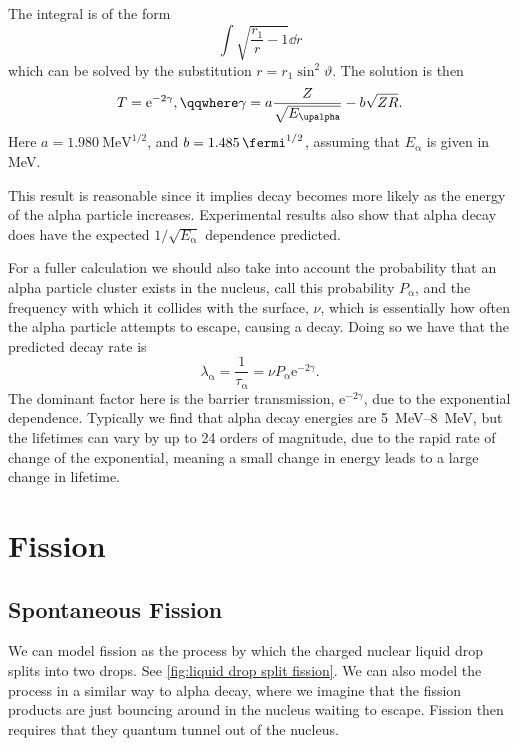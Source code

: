 \documentclass[fleqn]{NotesClass}
\newcommand*{\Palpha}{\ensuremath{\upalpha}}
\newcommand{\e}{\mathrm{e}}
\begin{document}
    The integral is of the form
    \begin{equation}
        \int \sqrt{\frac{r_1}{r} - 1} \dd{r}
    \end{equation}
    which can be solved by the substitution \(r = r_1 \sin^2\vartheta\).
    The solution is then
    \begin{equation}
        T = \e^{-2\gamma}, \qqwhere \gamma = a\frac{Z}{\sqrt{E_{\Palpha}}} - b\sqrt{ZR}.
    \end{equation}
    Here \(a = \qty{1.980}{\MeV\tothe{1/2}}\), and \(b = \qty{1.485}{\per\fermi\tothe{1/2}}\), assuming that \(E_{\Palpha}\) is given in \unit{\MeV}.
    
    This result is reasonable since it implies decay becomes more likely as the energy of the alpha particle increases.
    Experimental results also show that alpha decay does have the expected \(1/\sqrt{E_{\Palpha}}\) dependence predicted.
    
    For a fuller calculation we should also take into account the probability that an alpha particle cluster exists in the nucleus, call this probability \(P_{\Palpha}\), and the frequency with which it collides with the surface, \(\nu\), which is essentially how often the alpha particle attempts to escape, causing a decay.
    Doing so we have that the predicted decay rate is
    \begin{equation}
        \lambda_{\Palpha} = \frac{1}{\tau_{\Palpha}} = \nu P_{\Palpha} \e^{-2\gamma}.
    \end{equation}
    The dominant factor here is the barrier transmission, \(\e^{-2\gamma}\), due to the exponential dependence.
    Typically we find that alpha decay energies are \qtyrange{5}{8}{\MeV}, but the lifetimes can vary by up to 24 orders of magnitude, due to the rapid rate of change of the exponential, meaning a small change in energy leads to a large change in lifetime.
    
    \chapter{Fission}
    \section{Spontaneous Fission}
    We can model fission as the process by which the charged nuclear liquid drop splits into two drops.
    See \cref{fig:liquid drop split fission}.
    We can also model the process in a similar way to alpha decay, where we imagine that the fission products are just bouncing around in the nucleus waiting to escape.
    Fission then requires that they quantum tunnel out of the nucleus.
    
\end{document}

